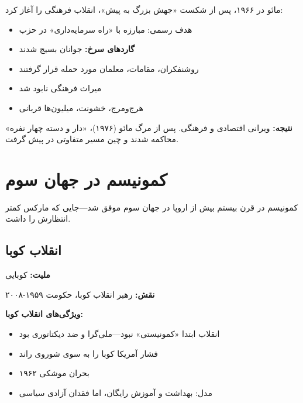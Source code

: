 \begin{historybox}
مائو در ۱۹۶۶، پس از شکست «جهش بزرگ به پیش»، انقلاب فرهنگی را آغاز کرد:
\begin{itemize}[nosep]
    \item هدف رسمی: مبارزه با «راه سرمایه‌داری» در حزب
    \item \textbf{گاردهای سرخ:} جوانان بسیج شدند
    \item روشنفکران، مقامات، معلمان مورد حمله قرار گرفتند
    \item میراث فرهنگی نابود شد
    \item هرج‌ومرج، خشونت، میلیون‌ها قربانی
\end{itemize}
\textbf{نتیجه:} ویرانی اقتصادی و فرهنگی. پس از مرگ مائو (۱۹۷۶)، «دار و دسته چهار نفره» محاکمه شدند و چین مسیر متفاوتی در پیش گرفت.
\end{historybox}

\section{کمونیسم در جهان سوم}

کمونیسم در قرن بیستم بیش از اروپا در جهان سوم موفق شد—جایی که مارکس کمتر انتظارش را داشت.

\subsection{انقلاب کوبا}

\begin{personbox}

\textbf{ملیت:} کوبایی

\textbf{نقش:} رهبر انقلاب کوبا، حکومت ۱۹۵۹-۲۰۰۸

\mediumspace

\textbf{ویژگی‌های انقلاب کوبا:}
\begin{itemize}[nosep]
    \item انقلاب ابتدا «کمونیستی» نبود—ملی‌گرا و ضد دیکتاتوری بود
    \item فشار آمریکا کوبا را به سوی شوروی راند
    \item بحران موشکی ۱۹۶۲
    \item مدل: بهداشت و آموزش رایگان، اما فقدان آزادی سیاسی
\end{itemize}
\end{personbox}

